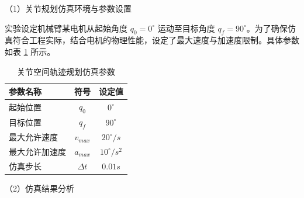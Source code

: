 （1）关节规划仿真环境与参数设置

实验设定机械臂某电机从起始角度 $q_0 = 0^\circ$ 运动至目标角度 $q_f = 90^\circ$。为了确保仿真符合工程实际，结合电机的物理性能，设定了最大速度与加速度限制。具体参数如表 \ref{tab:params} 所示。

\begin{table}[htbp]
    \centering
    \caption{关节空间轨迹规划仿真参数}
    \label{tab:params}
    \begin{tabular}{lcc}
    \toprule[1.5pt]
    \textbf{参数名称} & \textbf{符号} & \textbf{设定值} \\
    \midrule
    起始位置  & $q_0$ & $0^\circ$ \\
    目标位置 & $q_f$ & $90^\circ$ \\
    最大允许速度 & $v_{max}$ & $20^\circ/s$ \\
    最大允许加速度  & $a_{max}$ & $10^\circ/s^2$ \\
    仿真步长  & $\Delta t$ & $0.01s$ \\
    \bottomrule[1.5pt]
    \end{tabular}
    \end{table}

    （2）仿真结果分析

